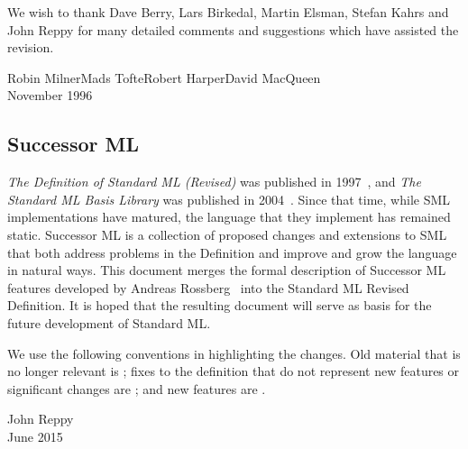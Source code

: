 

We wish to thank Dave Berry, Lars Birkedal, Martin Elsman, Stefan Kahrs
and John Reppy for many detailed comments and suggestions which have assisted
the revision.

\begin{flushright}
Robin Milner\quad Mads Tofte\quad Robert Harper\quad David MacQueen\\[1cm]
November 1996
\end{flushright}

{}

\subsection*{Successor ML}
{\it The Definition of Standard ML (Revised)} was published in 1997~\cite{sml97-definition}, and
{\it The Standard ML Basis Library} was published in 2004~\cite{sml-basis-lib}.
Since that time, while SML implementations have matured, the language that they
implement has remained static.
Successor ML is a collection of proposed changes and extensions to SML that both
address problems in the Definition and improve and grow the language in natural ways.
This document merges the formal description of Successor ML features developed
by Andreas Rossberg~\cite{hamlet-s} into the Standard ML Revised Definition.
It is hoped that the resulting document will serve as basis for the future development
of Standard ML.

We use the following conventions in highlighting the changes.
Old material that is no longer relevant is ; fixes to the
definition that do not represent new features or significant changes are
; and new features are .

\begin{flushright}
John Reppy\\[1cm]
June 2015
\end{flushright}

